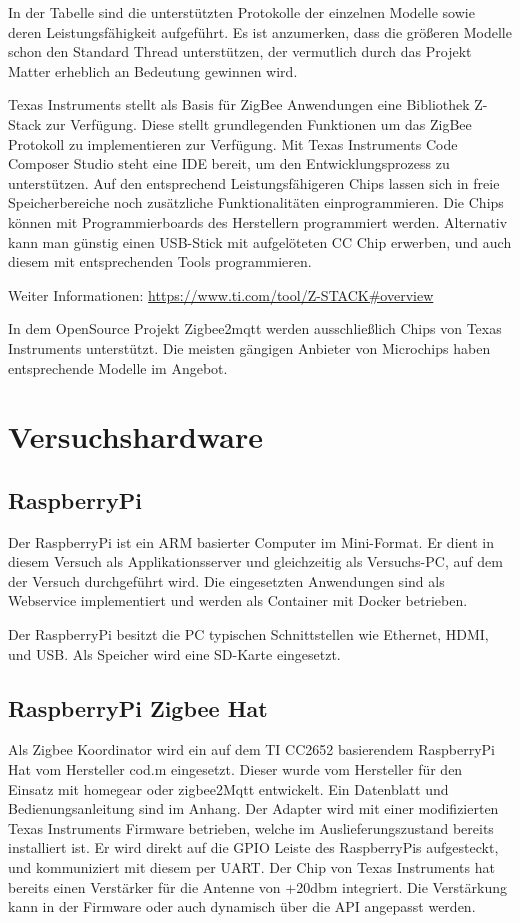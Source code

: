 In der Tabelle sind die unterstützten Protokolle der einzelnen Modelle sowie deren Leistungsfähigkeit aufgeführt.
Es ist anzumerken, dass die größeren Modelle schon den Standard Thread unterstützen, der vermutlich durch das
Projekt \grqq Matter\grqq{} erheblich an Bedeutung gewinnen wird.

Texas Instruments stellt als Basis für ZigBee Anwendungen eine Bibliothek \grqq Z-Stack\grqq{} zur Verfügung. Diese stellt grundlegenden 
Funktionen um das ZigBee Protokoll zu implementieren zur Verfügung. Mit Texas Instruments Code Composer Studio steht eine IDE bereit,
um den Entwicklungsprozess zu unterstützen. Auf den entsprechend Leistungsfähigeren Chips lassen sich in freie Speicherbereiche noch zusätzliche
Funktionalitäten einprogrammieren. Die Chips können mit Programmierboards des Herstellern programmiert werden. Alternativ kann man
günstig einen USB-Stick mit aufgelöteten CC Chip erwerben, und auch diesem mit entsprechenden Tools programmieren.

Weiter Informationen: \url{https://www.ti.com/tool/Z-STACK#overview}

In dem OpenSource Projekt Zigbee2mqtt werden ausschließlich Chips von Texas Instruments unterstützt. Die meisten gängigen Anbieter von Microchips 
haben entsprechende Modelle im Angebot. 

\section{Versuchshardware}

\subsection{RaspberryPi}

Der RaspberryPi ist ein ARM basierter Computer im Mini-Format. Er dient in diesem Versuch als Applikationsserver und gleichzeitig als Versuchs-PC, 
auf dem der Versuch durchgeführt wird. Die eingesetzten Anwendungen sind 
als Webservice implementiert und werden als Container mit Docker betrieben.

Der RaspberryPi besitzt die PC typischen Schnittstellen wie Ethernet, HDMI, und USB. Als Speicher wird eine SD-Karte eingesetzt. 

\subsection{RaspberryPi Zigbee Hat}

Als Zigbee Koordinator wird ein auf dem TI CC2652 basierendem RaspberryPi Hat vom Hersteller cod.m eingesetzt. Dieser wurde vom Hersteller
für den Einsatz mit \grqq homegear\grqq{} oder \grqq zigbee2Mqtt\grqq{} entwickelt. Ein Datenblatt und Bedienungsanleitung sind im Anhang.
Der Adapter wird mit einer modifizierten Texas Instruments Firmware betrieben, welche im Auslieferungszustand bereits installiert ist.
 Er wird direkt auf die GPIO Leiste des RaspberryPis aufgesteckt, und kommuniziert mit diesem per UART. Der Chip von Texas Instruments hat bereits
 einen Verstärker für die Antenne von +20dbm integriert. Die Verstärkung kann in der Firmware oder auch dynamisch über die API angepasst werden.

